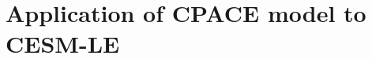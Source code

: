 
\chapter{Application of  CPACE model  to CESM-LE\label{cha:real_application}}  %

\ifpdf
    \graphicspath{{Chapter7/Figs/Raster/}{Chapter7/Figs/PDF/}{Chapter7/Figs/}}
\else
    \graphicspath{{Chapter7/Figs/Vector/}{Chapter7/Figs/}}
\fi
